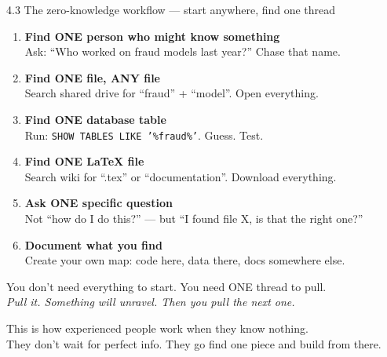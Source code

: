 \documentclass[aspectratio=169, 11pt]{beamer}
\begin{document}
	\begin{frame}{4.3 The zero-knowledge workflow — start anywhere, find one thread}
		\begin{enumerate}
			\item \textbf{Find ONE person who might know something} \\
			\small{Ask: ``Who worked on fraud models last year?'' Chase that name.}
			
			\item \textbf{Find ONE file, ANY file} \\
			\small{Search shared drive for ``fraud'' + ``model''. Open everything.}
			
			\item \textbf{Find ONE database table} \\
			\small{Run: \texttt{SHOW TABLES LIKE '\%fraud\%'}. Guess. Test.}
			
			\item \textbf{Find ONE LaTeX file} \\
			\small{Search wiki for ``.tex'' or ``documentation''. Download everything.}
			
			\item \textbf{Ask ONE specific question} \\
			\small{Not ``how do I do this?'' — but ``I found file X, is that the right one?''}
			
			\item \textbf{Document what you find} \\
			\small{Create your own map: code here, data there, docs somewhere else.}
		\end{enumerate}
		\vspace{0.2cm}
		\alert{You don't need everything to start. You need ONE thread to pull.} \\
		\textit{Pull it. Something will unravel. Then you pull the next one.}
		
		\vspace{0.1cm}
		\small{This is how experienced people work when they know nothing. \\
			They don't wait for perfect info. They go find one piece and build from there.}
	\end{frame}
	
	
\end{document}
